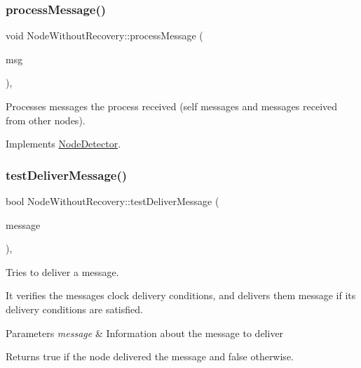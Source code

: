 \subsubsection{\texorpdfstring{process\+Message()}{processMessage()}}
{\footnotesize\ttfamily void Node\+Without\+Recovery\+::process\+Message (\begin{DoxyParamCaption}\item[{c\+Message $\ast$}]{msg }\end{DoxyParamCaption})\hspace{0.3cm}{\ttfamily [protected]}, {\ttfamily [virtual]}}



Processes messages the process received (self messages and messages received from other nodes). 



Implements \hyperlink{class_node_detector_ab69432c6d3327a684845ec231826727e}{Node\+Detector}.

\mbox{\label{class_node_without_recovery_a8cf83ec6d0af26e385dcde0bc03f5b6d}} 
\subsubsection{\texorpdfstring{test\+Deliver\+Message()}{testDeliverMessage()}}
{\footnotesize\ttfamily bool Node\+Without\+Recovery\+::test\+Deliver\+Message (\begin{DoxyParamCaption}\item[{const \hyperlink{structures_8h_a7e7bdc1d2fff8a9436f2f352b2711ed6}{message\+Info} \&}]{message }\end{DoxyParamCaption})\hspace{0.3cm}{\ttfamily [protected]}, {\ttfamily [virtual]}}



Tries to deliver a message. 

It verifies the message\textquotesingle{}s clock delivery conditions, and delivers them message if its delivery conditions are satisfied. 
\begin{DoxyParams}{Parameters}
{\em message} & Information about the message to deliver \\
\hline
\end{DoxyParams}
\begin{DoxyReturn}{Returns}
true if the node delivered the message and false otherwise. 
\end{DoxyReturn}



